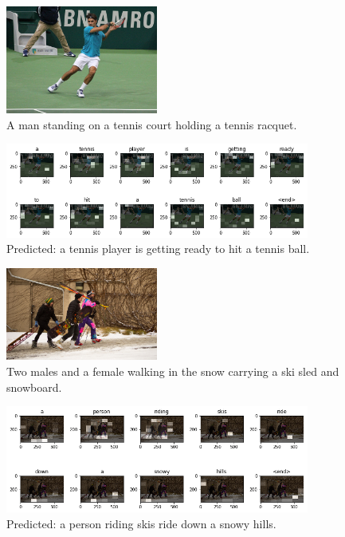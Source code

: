 
\begin{figure}[hpt]
	\centering
	\includegraphics[width=5cm]{images/ch5/example1.png}
	\caption{A man standing on a tennis court holding a tennis racquet.}
	\label{fig:example1}
\end{figure}

\begin{figure}[hpt]
	\centering
	\includegraphics[width=10cm]{images/ch5/example1-attention.png}
	\caption{Predicted: a tennis player is getting ready to hit a tennis ball.}
	\label{fig:example1-att}
\end{figure}


\begin{figure}[hpt]
	\centering
	\includegraphics[width=5cm]{images/ch5/example2.png}
	\caption{Two males and a female walking in the snow carrying a ski sled and snowboard.}
	\label{fig:example2}
\end{figure}

\begin{figure}[hpt]
	\centering
	\includegraphics[width=10cm]{images/ch5/example2-attention.png}
	\caption{Predicted: a person riding skis ride down a snowy hills.}
	\label{fig:example2-att}
\end{figure}


